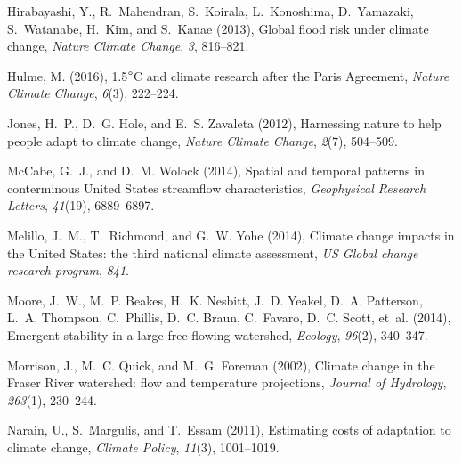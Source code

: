 \documentclass[linenumbers,draft]{AGUJournal}
\begin{document}
\begin{thebibliography}{30}
Hirabayashi, Y., R.~Mahendran, S.~Koirala, L.~Konoshima, D.~Yamazaki,
  S.~Watanabe, H.~Kim, and S.~Kanae (2013), Global flood risk under climate
  change, \textit{Nature Climate Change}, \textit{3}, 816--821.

Hulme, M. (2016), 1.5$\degree${C} and climate research after the {P}aris
  {A}greement, \textit{Nature Climate Change}, \textit{6}(3), 222--224.

Jones, H.~P., D.~G. Hole, and E.~S. Zavaleta (2012), Harnessing nature to help
  people adapt to climate change, \textit{Nature Climate Change},
  \textit{2}(7), 504--509.

McCabe, G.~J., and D.~M. Wolock (2014), Spatial and temporal patterns in
  conterminous {U}nited {S}tates streamflow characteristics,
  \textit{Geophysical Research Letters}, \textit{41}(19), 6889--6897.

Melillo, J.~M., T.~Richmond, and G.~W. Yohe (2014), Climate change impacts in
  the {U}nited {S}tates: the third national climate assessment, \textit{US
  Global change research program}, \textit{841}.

Moore, J.~W., M.~P. Beakes, H.~K. Nesbitt, J.~D. Yeakel, D.~A. Patterson, L.~A.
  Thompson, C.~Phillis, D.~C. Braun, C.~Favaro, D.~C. Scott, et~al. (2014),
  Emergent stability in a large free-flowing watershed, \textit{Ecology}, 
  \textit{96}(2), 340--347.

Morrison, J., M.~C. Quick, and M.~G. Foreman (2002), Climate change in the
  {F}raser {R}iver watershed: flow and temperature projections, \textit{Journal
  of Hydrology}, \textit{263}(1), 230--244.

Narain, U., S.~Margulis, and T.~Essam (2011), Estimating costs of adaptation to
  climate change, \textit{Climate Policy}, \textit{11}(3), 1001--1019.


\end{thebibliography}
\end{document}
